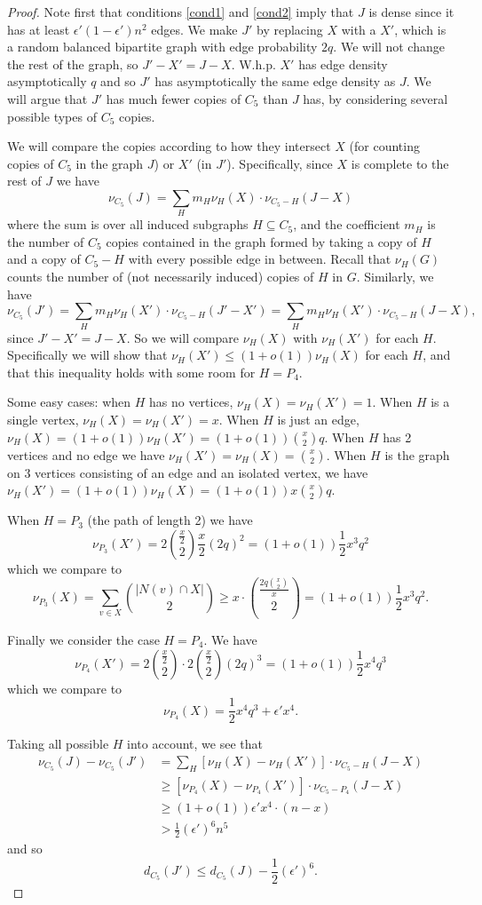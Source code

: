 \documentclass[12pt]{article}
\newcommand{\sbrac}[1]{\left[ #1 \right]}
\newcommand{\eps}{\epsilon}
\theoremstyle{definition}
\theoremstyle{remark}
\renewcommand{\ge}{\geqslant}
\renewcommand{\le}{\leqslant}
\begin{document}
\begin{proof}
Note first that conditions \eqref{cond1} and \eqref{cond2} imply that $J$ is dense since it has at least $\eps' (1-\eps')n^2$ edges. We make $J'$ by replacing $X$ with a $X'$, which is a random balanced bipartite graph with edge probability $2q$. We will not change the rest of the graph, so $J'-X'=J-X$. W.h.p.  $X'$ has edge density asymptotically $q$ and so $J'$ has asymptotically the same edge density as $J$. We will argue that $J'$ has much fewer copies of $C_5$ than $J$ has, by considering several possible types of $C_5$ copies. 

We will compare the copies according to how they intersect $X$ (for counting copies of $C_5$ in the graph $J$) or $X'$ (in $J'$). Specifically, since $X$  is complete to the rest of  $J$   we have
\[
\nu_{C_5}(J) = \sum_H m_H \nu_{H}(X)\cdot \nu_{C_5-H}(J - X)
\]
where the sum is over all induced subgraphs $H \subseteq C_5$, and the coefficient $m_H$ is the number of $C_5$ copies contained in the graph formed by taking a copy of $H$ and a copy of $C_5-H$ with every possible edge in between. Recall that $\nu_H(G)$ counts the number of (not necessarily induced) copies of $H$ in $G$. Similarly,  we have
\[
\nu_{C_5}(J')= \sum_H m_H \nu_{H}(X')\cdot \nu_{C_5-H}(J'-X') =\sum_H m_H \nu_{H}(X')\cdot \nu_{C_5-H}(J-X),
\]
since $J'-X' = J-X$. So we will compare $\nu_{H}(X)$ with $\nu_{H}(X')$ for each $H$. Specifically we will show that $\nu_{H}(X') \le (1+o(1))\nu_{H}(X)$ for each $H$, and that this inequality holds with some room for $H=P_4$.

Some easy cases: when $H$ has no vertices, $\nu_{H}(X) = \nu_{H}(X') = 1$. 
When $H$ is a single vertex, $\nu_{H}(X) = \nu_{H}(X') = x$. When $H$ is just an edge, $\nu_{H}(X) = (1+o(1))\nu_{H}(X') = (1+o(1))\binom{x}{2}q$. When $H$ has 2 vertices and no edge we have $\nu_{H}(X') = \nu_{H}(X) = \binom{x}{2}$.  When $H$ is the graph on 3 vertices consisting of an edge and an isolated vertex, we have $\nu_{H}(X') = (1+o(1))\nu_{H}(X) = (1+o(1))x\binom{x}{2}q$.


When $H=P_3$ (the path of length 2) we have 
\[
\nu_{P_3}(X')= 2\binom{\frac x2}{2}\frac x2(2q)^2 = (1+o(1))\frac12 x^3 q^2
\]
 which we compare to 
 \[
\nu_{P_3}(X)= \sum_{v \in X} \binom{|N(v) \cap X|}{2} \ge x \cdot \binom{\frac{2q \binom{x}{2}}{x}}{2}=(1+o(1))\frac12 x^3 q^2.
 \]


Finally we consider the case $H=P_4$. We have
\[
\nu_{P_4}(X')=2\binom{\frac x2}{2} \cdot 2\binom{\frac x2}{2} (2q)^3 = (1+o(1)) \frac 1{2} x^4 q^3
\]
which we compare to
 \[
\nu_{P_4}(X)= \frac 12 x^4 q^3 + \eps' x^4.
 \]

Taking all possible $H$ into account, we see that 
\begin{align*}
\nu_{C_5}(J)- \nu_{C_5}(J') &=  \sum_H \sbrac{ \nu_{H}(X) - \nu_{H}(X')}\cdot \nu_{C_5-H}(J - X) \\
& \ge \sbrac{\nu_{P_4}(X) - \nu_{P_4}(X')}\cdot\nu_{C_5-P_4}(J - X) \\
& \ge (1+o(1)) \eps' x^4 \cdot (n-x) \\
& >\frac 12 (\eps')^6 n^5 
\end{align*}
and so $$d_{C_5}(J') \le d_{C_5}(J) - \frac 12 (\eps')^6.$$
\end{proof}
\end{document}
